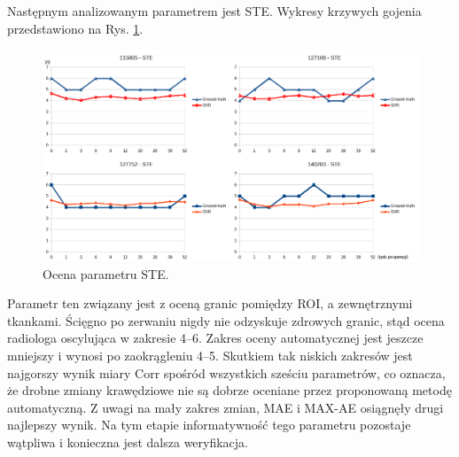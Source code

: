 Następnym analizowanym parametrem jest STE. Wykresy krzywych gojenia przedstawiono na Rys. \ref{fig:STE}.
\begin{figure}[h!]
	\centering
	\includegraphics[width=1\textwidth]{figures/STE.png}
	\caption{Ocena parametru STE.}\label{fig:STE}
\end{figure}
Parametr ten związany jest z oceną granic pomiędzy ROI, a zewnętrznymi tkankami. Ścięgno po zerwaniu nigdy nie odzyskuje zdrowych granic, stąd ocena radiologa oscylująca w zakresie 4--6. Zakres oceny automatycznej jest jeszcze mniejszy i wynosi po zaokrągleniu 4--5. Skutkiem tak niskich zakresów jest najgorszy wynik miary Corr spośród wszystkich sześciu parametrów, co oznacza, że drobne zmiany krawędziowe nie są dobrze oceniane przez proponowaną metodę automatyczną. Z uwagi na mały zakres zmian, MAE i MAX-AE osiągnęły drugi najlepszy wynik. Na tym etapie informatywność tego parametru pozostaje wątpliwa i konieczna jest dalsza weryfikacja.

